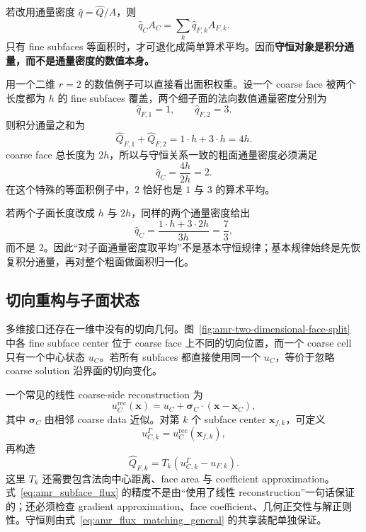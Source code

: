 若改用通量密度 $\widehat q=\widehat Q/A$，则
\begin{equation}
\widehat q_CA_C
=
\sum_k\widehat q_{F,k}A_{F,k}.
\end{equation}
只有 fine subfaces 等面积时，才可退化成简单算术平均。因而\textbf{守恒对象是积分通量，而不是通量密度的数值本身。}

用一个二维 $r=2$ 的数值例子可以直接看出面积权重。设一个 coarse face 被两个长度都为 $h$ 的 fine subfaces 覆盖，两个细子面的法向数值通量密度分别为
\begin{equation}
\widehat q_{F,1}=1,
\qquad
\widehat q_{F,2}=3.
\end{equation}
则积分通量之和为
\begin{equation}
\widehat Q_{F,1}+\widehat Q_{F,2}
=
1\cdot h+3\cdot h
=
4h.
\end{equation}
coarse face 总长度为 $2h$，所以与守恒关系一致的粗面通量密度必须满足
\begin{equation}
\widehat q_C
=
\frac{4h}{2h}
=
2.
\end{equation}
在这个特殊的等面积例子中，$2$ 恰好也是 $1$ 与 $3$ 的算术平均。

若两个子面长度改成 $h$ 与 $2h$，同样的两个通量密度给出
\begin{equation}
\widehat q_C
=
\frac{1\cdot h+3\cdot2h}{3h}
=
\frac73,
\end{equation}
而不是 $2$。因此“对子面通量密度取平均”不是基本守恒规律；基本规律始终是先恢复积分通量，再对整个粗面做面积归一化。

\subsection{切向重构与子面状态}

多维接口还存在一维中没有的切向几何。图~\ref{fig:amr-two-dimensional-face-split} 中各 fine subface center 位于 coarse face 上不同的切向位置，而一个 coarse cell 只有一个中心状态 $u_C$。若所有 subfaces 都直接使用同一个 $u_C$，等价于忽略 coarse solution 沿界面的切向变化。

一个常见的线性 coarse-side reconstruction 为
\begin{equation}
u_C^{\mathrm{rec}}(\bm x)
=u_C+\bm\sigma_C\cdot(\bm x-\bm x_C),
\label{eq:amr_coarse_reconstruction}
\end{equation}
其中 $\bm\sigma_C$ 由相邻 coarse data 近似。对第 $k$ 个 subface center $\bm x_{f,k}$，可定义
\begin{equation}
u_{C,k}^{\Gamma}
=u_C^{\mathrm{rec}}(\bm x_{f,k}),
\end{equation}
再构造
\begin{equation}
\widehat Q_{F,k}
=T_k\left(u_{C,k}^{\Gamma}-u_{F,k}\right).
\label{eq:amr_subface_flux}
\end{equation}
这里 $T_k$ 还需要包含法向中心距离、face area 与 coefficient approximation。式~\eqref{eq:amr_subface_flux} 的精度不是由“使用了线性 reconstruction”一句话保证的；还必须检查 gradient approximation、face coefficient、几何正交性与解正则性。守恒则由式~\eqref{eq:amr_flux_matching_general} 的共享装配单独保证。

